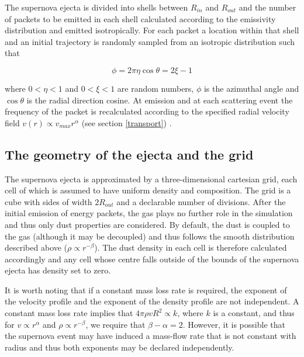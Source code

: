 \documentclass[useAMS,usenatbib,usegraphicx]{mnras}
\begin{document}
The supernova ejecta is divided into shells between $R_{in}$ and $R_{out}$ and the number of packets to be emitted in each shell calculated according to the emissivity distribution and emitted isotropically.  For each packet a location within that shell and an initial trajectory is randomly sampled from an isotropic distribution such that 

\begin{equation}
\phi=2\pi\eta 
 \cos \theta=2\xi -1
\end{equation}

\noindent where $0<\eta<1$ and $0<\xi<1$ are random numbers, $\phi$ is the azimuthal angle and $\cos \theta$ is the radial direction cosine.  At emission and at each scattering event the frequency of the packet is recalculated according to the specified radial velocity field $v(r) \propto v_{max}r^{\alpha}$ (see section \ref{transport}) .




\subsection{The geometry of the ejecta and the grid}
\label{grid}
The supernova ejecta is approximated by a three-dimensional cartesian grid, each cell of which is assumed to have uniform density and composition.  The grid is a cube with  sides of width $2R_{out}$ and a declarable number of divisions.  After the initial emission of energy packets, the gas plays no further role in the simulation and thus only dust properties are considered.  By default, the dust is coupled to the gas (although it may be decoupled) and thus follows the smooth distribution described above ($\rho \propto r^{-\beta}$).  The dust density in each cell is therefore calculated accordingly and any cell whose centre falls outside of the bounds of the supernova ejecta has density set to zero.  

It is worth noting that if a constant mass loss rate is required, the exponent of the velocity profile and the exponent of the density profile are not independent.  A constant mass loss rate implies that $4\pi \rho vR^2  \propto k$, where $k$ is a constant, and thus for $v \propto r^\alpha$ and $\rho\propto r^{-\beta}$, we require that $\beta-\alpha=2$.  However,  it is possible that the supernova event may have induced a mass-flow rate that is not constant with radius and thus both exponents may be declared independently.
\end{document}
